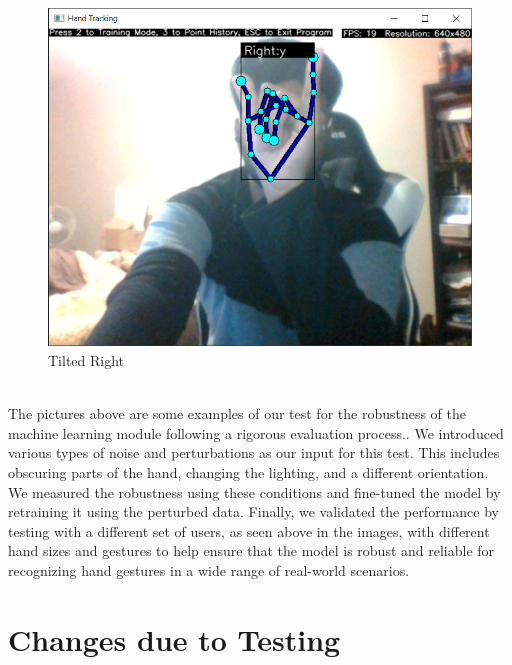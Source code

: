 \documentclass[12pt, titlepage]{article}
\begin{document}
\begin{figure}[!ht]
  \includegraphics[width=\linewidth]{right_y.png}
  \caption{Tilted Right}\label{fig:Tilted Right}
\endminipage\hfill
\end{figure}
~\\
The pictures above are some examples of our test for the robustness of the machine 
learning module following a rigorous evaluation process.. We introduced various types 
of noise and perturbations as our input for this test. This includes obscuring parts 
of the hand, changing the lighting, and a different orientation. We measured the robustness
using these conditions and fine-tuned the model by retraining it using the perturbed data. 
Finally, we validated the performance by testing with a different set of users, as seen above 
in the images, with different hand sizes and gestures to help ensure that the model is robust 
and reliable for recognizing hand gestures in a wide range of real-world scenarios.
\endminipage

\section{Changes due to Testing}
\end{document}

